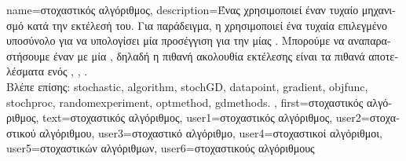 {name={\foreignlanguage{greek}{στοχαστικός αλγόριθμος}}, 
	description={\foreignlanguage{greek}{Ένας}   
		\foreignlanguage{greek}{χρησιμοποι\-εί έναν τυχαίο μηχανισμό κατά την εκτέλεσή του. Για παράδειγμα, η} 
		 \foreignlanguage{greek}{χρησιμοποιεί ένα τυχαία επιλεγμένο υποσύνολο}   
		\foreignlanguage{greek}{για να υπολογίσει μία προσέγγιση για την}  \foreignlanguage{greek}{μίας} . 
		\foreignlanguage{greek}{Μπορούμε να αναπαραστήσουμε έναν}   \foreignlanguage{greek}{με 
		μία} , \foreignlanguage{greek}{δηλαδή η πιθανή ακολουθία εκτέλεσης είναι τα πιθανά αποτελέσματα 
		ενός}  \cite{BertsekasProb}, \cite{RandomizedAlgos}, \cite{Gallager13}. \\ 
		\foreignlanguage{greek}{Βλέπε επίσης:} \gls{stochastic}, \gls{algorithm}, \gls{stochGD}, \gls{datapoint}, \gls{gradient}, \gls{objfunc}, \gls{stochproc}, 
		\gls{randomexperiment}, \gls{optmethod}, \gls{gdmethods}. },
	first={\foreignlanguage{greek}{στοχαστικός αλγόριθμος}},
	text={\foreignlanguage{greek}{στοχαστικός αλγόριθμος}},
	user1={\foreignlanguage{greek}{στοχαστικός αλγόριθμος}}, %
	user2={\foreignlanguage{greek}{στοχαστικού αλγόριθμου}}, %
	user3={\foreignlanguage{greek}{στοχαστικό αλγόριθμο}}, %
	user4={\foreignlanguage{greek}{στοχαστικοί αλγόριθμοι}}, %
	user5={\foreignlanguage{greek}{στοχαστικών αλγόριθμων}}, %
	user6={\foreignlanguage{greek}{στοχαστικούς αλγόριθμους}} %
}

